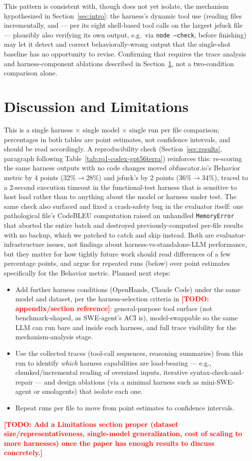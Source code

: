 \documentclass[11pt]{article}
\newcommand{\todo}[1]{\textcolor{red}{\textbf{[TODO: #1]}}}
\begin{document}
This pattern is consistent with, though does not yet isolate, the
mechanism hypothesized in Section~\ref{sec:intro}: the harness's dynamic
tool use (reading files incrementally, and --- per its eight shell-based
tool calls on the largest jsfuck file --- plausibly also verifying its own
output, e.g.\ via \texttt{node --check}, before finishing) may let it
detect and correct behaviorally-wrong output that the single-shot baseline
has no opportunity to revise. Confirming that requires the trace analysis
and harness-component ablations described in
Section~\ref{sec:discussion}, not a two-condition comparison alone.

\section{Discussion and Limitations}
\label{sec:discussion}

This is a single harness $\times$ single model $\times$ single run per file
comparison; percentages in both tables are point estimates, not confidence
intervals, and should be read accordingly. A reproducibility check
(Section~\ref{sec:results}, paragraph following
Table~\ref{tab:rq1-codex-gpt56terra}) reinforces this: re-scoring the same
harness outputs with no code changes moved obfuscator.io's Behavior metric by 4 points (32\%$\to$28\%) and jsfuck's by
2 points (36\%$\to$34\%), traced to a 2-second execution timeout in the
functional-test harness that is sensitive to host load rather than to
anything about the model or harness under test. The same check also
surfaced and fixed a crash-safety bug in the evaluator itself: one
pathological file's CodeBLEU computation raised an unhandled
\texttt{MemoryError} that aborted the entire batch and destroyed
previously-computed per-file results with no backup, which we patched to
catch and skip instead. Both are evaluator-infrastructure
issues, not findings about harness-vs-standalone-LLM performance, but they
matter for how tightly future work should read differences of a few
percentage points, and argue for repeated runs (below) over point
estimates specifically for the Behavior metric. Planned next steps:

\begin{itemize}
  \item Add further harness conditions (OpenHands, Claude Code) under the
    same model and dataset, per the harness-selection criteria in
    \todo{appendix/section reference}: general-purpose tool surface (not
    benchmark-shaped, as SWE-agent's ACI is), model-swappable so the same
    LLM can run bare and inside each harness, and full trace visibility for
    the mechanism-analysis stage.
  \item Use the collected traces (tool-call sequences, reasoning summaries)
    from this run to identify \emph{which} harness capabilities are
    load-bearing --- e.g., chunked/incremental reading of oversized inputs,
    iterative syntax-check-and-repair --- and design ablations (via a
    minimal harness such as mini-SWE-agent or smolagents) that isolate each
    one.
  \item Repeat runs per file to move from point estimates to confidence
    intervals.
\end{itemize}

\todo{Add a Limitations section proper (dataset size/representativeness,
single-model generalization, cost of scaling to more harnesses) once the
paper has enough results to discuss concretely.}
\end{document}

